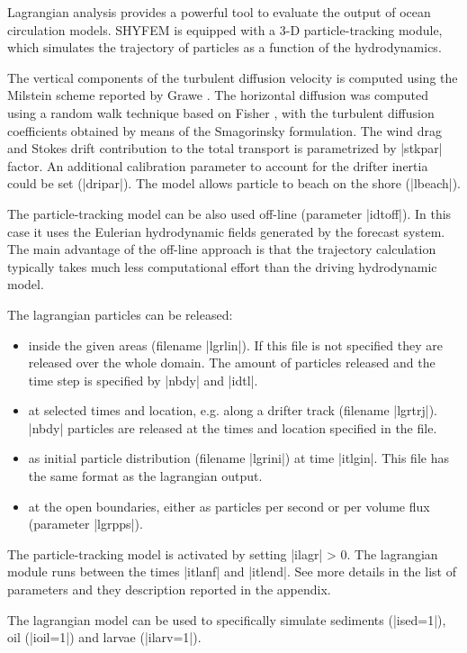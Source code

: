 Lagrangian analysis provides a powerful tool to evaluate the output
of ocean circulation models. SHYFEM is equipped with a 3-D 
particle-tracking module, which simulates the trajectory of 
particles as a function of the hydrodynamics. 

The vertical components of the turbulent diffusion velocity is
computed using the Milstein scheme reported by Grawe 
\cite{Grawe2010}. The horizontal diffusion was computed using a 
random walk technique based on Fisher \cite{Fisher1979}, with the 
turbulent diffusion coefficients obtained by means of the 
Smagorinsky \cite{Smagorinsky1993} formulation. The wind drag 
and Stokes drift contribution to the total transport is parametrized
by |stkpar| factor. An additional calibration parameter to account
for the drifter inertia could be set (|dripar|). The model allows
particle to beach on the shore (|lbeach|). 

The particle-tracking model can be also used off-line (parameter
|idtoff|). In this case it uses the Eulerian hydrodynamic fields 
generated by the forecast system. The main advantage of the 
off-line approach is that the trajectory calculation typically 
takes much less computational effort than the driving hydrodynamic 
model.

The lagrangian particles can be released:
\begin{itemize}
\item inside the given areas (filename |lgrlin|). If this file is not 
      specified they are released over the whole domain. The amount of
      particles released and the time step is specified by |nbdy| and 
      |idtl|.
\item at selected times and location, e.g. along a drifter track
      (filename |lgrtrj|). |nbdy| particles are released at the times
      and location specified in the file.
\item as initial particle distribution (filename |lgrini|) at time
      |itlgin|. This file has the same format as the lagrangian output.
\item at the open boundaries, either as particles per second or per
      volume flux (parameter |lgrpps|).
\end{itemize}

The particle-tracking model is activated by setting |ilagr| > 0.
The lagrangian module runs between the times |itlanf| and |itlend|.
See more details in the list of parameters and they description 
reported in the appendix.

The lagrangian model can be used to specifically simulate sediments
(|ised=1|), oil (|ioil=1|) and larvae (|ilarv=1|).
